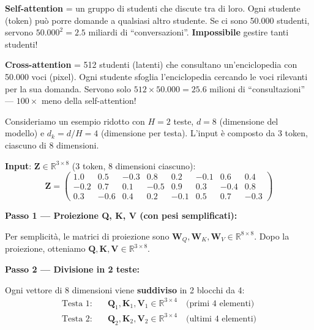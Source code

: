 \documentclass[12pt,a4paper]{article}
\begin{document}
\begin{notabox}
\textbf{Self-attention} = un gruppo di studenti che discute tra di loro. Ogni studente (token) pu\`o porre domande a qualsiasi altro studente. Se ci sono 50.000 studenti, servono $50.000^2 = 2.5$ miliardi di ``conversazioni''. \textbf{Impossibile} gestire tanti studenti!

\textbf{Cross-attention} = 512 studenti (latenti) che consultano un'enciclopedia con 50.000 voci (pixel). Ogni studente sfoglia l'enciclopedia cercando le voci rilevanti per la sua domanda. Servono solo $512 \times 50.000 = 25.6$ milioni di ``consultazioni'' --- $100\times$ meno della self-attention!
\end{notabox}


\begin{examplebox}
Consideriamo un esempio ridotto con $H = 2$ teste, $d = 8$ (dimensione del modello) e $d_k = d/H = 4$ (dimensione per testa). L'input \`e composto da 3 token, ciascuno di 8 dimensioni.

\textbf{Input}: $\mathbf{Z} \in \mathbb{R}^{3 \times 8}$ (3 token, 8 dimensioni ciascuno):
\[
\mathbf{Z} = \begin{pmatrix} 1.0 & 0.5 & -0.3 & 0.8 & 0.2 & -0.1 & 0.6 & 0.4 \\ -0.2 & 0.7 & 0.1 & -0.5 & 0.9 & 0.3 & -0.4 & 0.8 \\ 0.3 & -0.6 & 0.4 & 0.2 & -0.1 & 0.5 & 0.7 & -0.3 \end{pmatrix}
\]

\textbf{Passo 1 --- Proiezione Q, K, V (con pesi semplificati):}

Per semplicit\`a, le matrici di proiezione sono $\mathbf{W}_Q, \mathbf{W}_K, \mathbf{W}_V \in \mathbb{R}^{8 \times 8}$. Dopo la proiezione, otteniamo $\mathbf{Q}, \mathbf{K}, \mathbf{V} \in \mathbb{R}^{3 \times 8}$.

\textbf{Passo 2 --- Divisione in 2 teste:}

Ogni vettore di 8 dimensioni viene \textbf{suddiviso} in 2 blocchi da 4:
\begin{align*}
\text{Testa 1}: \quad &\mathbf{Q}_1, \mathbf{K}_1, \mathbf{V}_1 \in \mathbb{R}^{3 \times 4} \quad \text{(primi 4 elementi)} \\
\text{Testa 2}: \quad &\mathbf{Q}_2, \mathbf{K}_2, \mathbf{V}_2 \in \mathbb{R}^{3 \times 4} \quad \text{(ultimi 4 elementi)}
\end{align*}


\end{examplebox}
\end{document}
